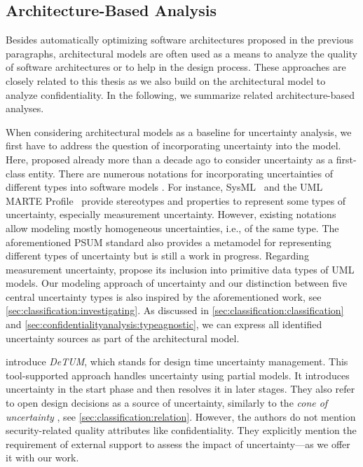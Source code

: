 \subsection{Architecture-Based Analysis}

Besides automatically optimizing software architectures proposed in the previous paragraphs, architectural models are often used as a means to analyze the quality of software architectures or to help in the design process.
These approaches are closely related to this thesis as we also build on the architectural model to analyze confidentiality.
In the following, we summarize related architecture-based analyses.

When considering architectural models as a baseline for uncertainty analysis, we first have to address the question of incorporating uncertainty into the model.
Here, \textcite{garlan_software_2010} proposed already more than a decade ago to consider uncertainty as a first-class entity.
There are numerous notations for incorporating uncertainties of different types into software models \cite{troya_uncertainty_2021}. 
For instance, SysML~\cite{object_management_group_omg_2023} and the \acf{UML} MARTE Profile~\cite{object_management_group_uml_2011} provide stereotypes and properties to represent some types of uncertainty, especially measurement uncertainty. 
However, existing notations allow modeling mostly homogeneous uncertainties, i.e., of the same type.
The aforementioned \ac{PSUM} standard \cite{PSUM} also provides a metamodel for representing different types of uncertainty but is still a work in progress.
Regarding measurement uncertainty, \textcite{bertoa_incorporating_2020} propose its inclusion into primitive data types of \ac{UML} models.
Our modeling approach of uncertainty and our distinction between five central uncertainty types is also inspired by the aforementioned work, see \autoref{sec:classification:investigating}.
As discussed in \autoref{sec:classification:classification} and \autoref{sec:confidentialityanalysis:typeagnostic}, we can express all identified uncertainty sources \cite{hahner_arcn_2024} as part of the architectural model.

\textcite{famelis_managing_2019} introduce \emph{DeTUM}, which stands for design time uncertainty management.
This tool-supported approach handles uncertainty using partial models.
It introduces uncertainty in the start phase and then resolves it in later stages.
They also refer to open design decisions as a source of uncertainty, similarly to the \emph{cone of uncertainty} \cite{mcconnell_software_1998}, see \autoref{sec:classification:relation}.
However, the authors do not mention security-related quality attributes like confidentiality.
They explicitly mention the requirement of external support to assess the impact of uncertainty---as we offer it with our work.

